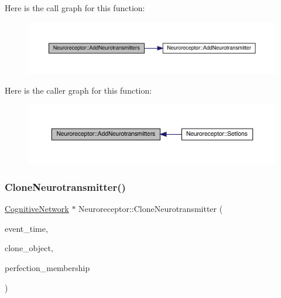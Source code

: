 Here is the call graph for this function\+:\nopagebreak
\begin{figure}[H]
\begin{center}
\leavevmode
\includegraphics[width=350pt]{class_neuroreceptor_a2e4cbd9debd555091923f57f8aa11fe4_cgraph}
\end{center}
\end{figure}
Here is the caller graph for this function\+:\nopagebreak
\begin{figure}[H]
\begin{center}
\leavevmode
\includegraphics[width=350pt]{class_neuroreceptor_a2e4cbd9debd555091923f57f8aa11fe4_icgraph}
\end{center}
\end{figure}
\mbox{\label{class_neuroreceptor_a5629a3d463cc963138ff017ec499720d}} 
\subsubsection{\texorpdfstring{Clone\+Neurotransmitter()}{CloneNeurotransmitter()}}
{\footnotesize\ttfamily \hyperlink{class_cognitive_network}{Cognitive\+Network} $\ast$ Neuroreceptor\+::\+Clone\+Neurotransmitter (\begin{DoxyParamCaption}\item[{std\+::chrono\+::time\+\_\+point$<$ \hyperlink{universe_8h_a0ef8d951d1ca5ab3cfaf7ab4c7a6fd80}{Clock} $>$}]{event\+\_\+time,  }\item[{\hyperlink{class_cognitive_network}{Cognitive\+Network} $\ast$}]{clone\+\_\+object,  }\item[{double}]{perfection\+\_\+membership }\end{DoxyParamCaption})}




